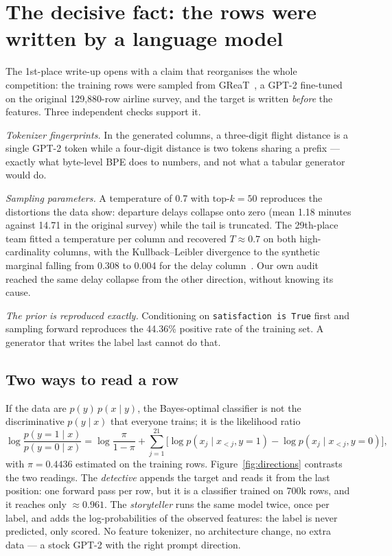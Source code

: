 \section{The decisive fact: the rows were written by a language model}
\label{sec:generator}

The 1st-place write-up opens with a claim that reorganises the whole competition: the
training rows were sampled from GReaT~\citep{borisov2023greaT}, a GPT-2 fine-tuned on the
original 129{,}880-row airline survey, and the target is written \emph{before} the
features. Three independent checks support it.

\emph{Tokenizer fingerprints.} In the generated columns, a three-digit flight distance is a
single GPT-2 token while a four-digit distance is two tokens sharing a prefix --- exactly
what byte-level BPE does to numbers, and not what a tabular generator would do.

\emph{Sampling parameters.} A temperature of 0.7 with top-$k=50$ reproduces the distortions
the data show: departure delays collapse onto zero (mean 1.18 minutes against 14.71 in the
original survey) while the tail is truncated. The 29th-place team fitted a temperature per
column and recovered $T\approx0.7$ on both high-cardinality columns, with the
Kullback--Leibler divergence to the synthetic marginal falling from 0.308 to 0.004 for the
delay column~\citep{kaggle_twentyninth}. Our own audit reached the same delay collapse from
the other direction, without knowing its cause.

\emph{The prior is reproduced exactly.} Conditioning on \texttt{satisfaction is True}
first and sampling forward reproduces the 44.36\% positive rate of the training set. A
generator that writes the label last cannot do that.

\subsection{Two ways to read a row}

If the data are $p(y)\,p(x\mid y)$, the Bayes-optimal classifier is not the discriminative
$p(y\mid x)$ that everyone trains; it is the likelihood ratio
\begin{equation}
\log\frac{p(y{=}1\mid x)}{p(y{=}0\mid x)}
= \log\frac{\pi}{1-\pi}
+ \sum_{j=1}^{21}\Big[\log p(x_j\mid x_{<j},y{=}1)-\log p(x_j\mid x_{<j},y{=}0)\Big],
\label{eq:bayes}
\end{equation}
with $\pi=0.4436$ estimated on the training rows. Figure~\ref{fig:directions} contrasts the
two readings. The \emph{detective} appends the target and reads it from the last position:
one forward pass per row, but it is a classifier trained on 700k rows, and it reaches only
$\approx0.961$. The \emph{storyteller} runs the same model twice, once per label, and adds
the log-probabilities of the observed features: the label is never predicted, only scored.
No feature tokenizer, no architecture change, no extra data --- a stock GPT-2 with the
right prompt direction.


